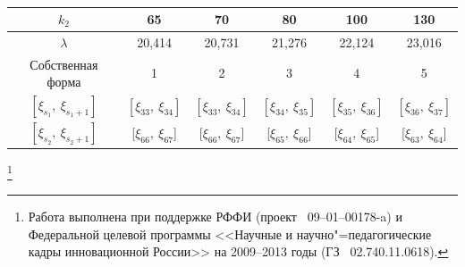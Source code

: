 \begin{table}[h!]

\centering

\small

\caption{\bf } \vspace{-3mm}

\centering

\begin{tabular}{c|c|c|c|c|c}  

\hline

$k_2$ & 65 & 70 & 80 & 100 & 130\\ \hline

$\lambda$ & 20,414 & 20,731 & 21,276 & 22,124 & 23,016 \\ \hline

{\small Собственная форма} & 1 & 2 & 3 & 4 & 5 \\ \hline

$[\xi_{s_1},\ \xi_{s_1+1}]$ & $[\xi_{33},\ \xi_{34}]$ & $[\xi_{33},\ \xi_{34}]$ & $[\xi_{34},\ \xi_{35}]$ & $[\xi_{35},\ \xi_{36}]$ & $[\xi_{36},\ \xi_{37}]$ \\

$[\xi_{s_2},\ \xi_{s_2+1}]$ & [$\xi_{66},\ \xi_{67}$] & [$\xi_{66},\ \xi_{67}$] & [$\xi_{65},\ \xi_{66}$] & [$\xi_{64},\ \xi_{65}$] & [$\xi_{63},\ \xi_{64}$] \\\hline

\end{tabular}

\label{table4}

\end{table}







\thanks{Работа выполнена при поддержке РФФИ (проект \No~09--01--00178-a) и Федеральной целевой программы <<Научные и научно"=педагогические кадры инновационной России>> на 2009--2013 годы (ГЗ \No~02.740.11.0618).}



\clearpage



